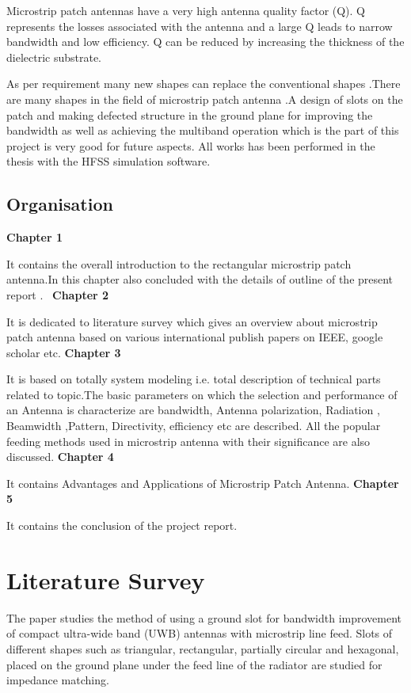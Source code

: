 \documentclass[12pt]{article}
\begin{document}
 \justify
   Microstrip patch antennas have a very high antenna quality factor (Q). Q represents the losses associated with the antenna and a large Q leads to narrow bandwidth and low efficiency. Q can be reduced by increasing the thickness of the dielectric substrate.

 \justify
   As per requirement many new shapes can replace the conventional shapes .There are many shapes in the field of microstrip patch antenna .A design of slots on the patch and making defected structure in the ground plane for improving the bandwidth as well as achieving the multiband operation which is the part of this project is very good for future aspects. All works has been performed in the thesis with the HFSS simulation software.

\cleardoublepage


\subsection{Organisation}\label{sub:Organisation}
 \justify
  \textbf{Chapter 1}

      It contains the overall introduction to the rectangular microstrip patch antenna.In this chapter also concluded with the details of outline of the present report .\
 \justify
  \textbf{Chapter 2}

      It is dedicated to literature survey which gives an overview about microstrip patch antenna based on various international publish papers on IEEE, google scholar etc.
 \justify
  \textbf{Chapter 3}

      It is based on totally system modeling i.e. total description of technical parts related to topic.The basic parameters on which the selection and performance of an Antenna is characterize are bandwidth, Antenna polarization, Radiation , Beamwidth ,Pattern, Directivity, efficiency etc are described. All the popular feeding methods used in microstrip antenna with their significance are also discussed.
 \justify
  \textbf{Chapter 4}

      It contains Advantages and Applications of Microstrip Patch Antenna.
 \justify
  \textbf{Chapter 5}

      It contains the conclusion of the project report.

\section{Literature Survey}\label{sec:Literature Survey}
\justify
The paper studies the method of using a ground slot for bandwidth improvement of compact ultra-wide band (UWB) antennas with microstrip line feed. Slots of different shapes such as triangular, rectangular, partially circular and hexagonal, placed on the ground plane under the feed line of the radiator are studied for impedance matching. 
\end{document}
